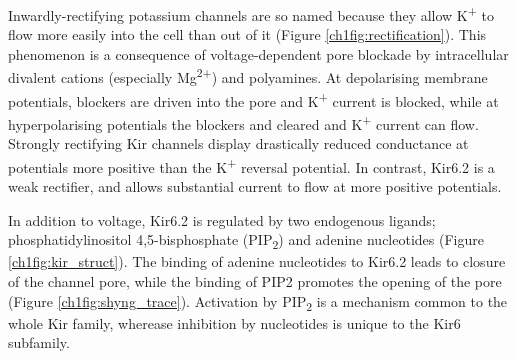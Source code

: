 Inwardly-rectifying potassium channels are so named because they allow K\textsuperscript{+} to flow more easily into the cell than out of it (Figure \ref{ch1fig:rectification}).
This phenomenon is a consequence of voltage-dependent pore blockade by intracellular divalent cations (especially Mg\textsuperscript{2+}) and polyamines.
At depolarising membrane potentials, blockers are driven into the pore and K\textsuperscript{+} current is blocked, while at hyperpolarising potentials the blockers and cleared and K\textsuperscript{+} current can flow.
Strongly rectifying Kir channels display drastically reduced conductance at potentials more positive than the K\textsuperscript{+} reversal potential.
In contrast, Kir6.2 is a weak rectifier, and allows substantial current to flow at more positive potentials.

In addition to voltage, Kir6.2 is regulated by two endogenous ligands; 
phosphatidylinositol 4,5-bisphosphate (PIP\textsubscript{2}) and adenine nucleotides (Figure \ref{ch1fig:kir_struct}).
The binding of adenine nucleotides to Kir6.2 leads to closure of the channel pore, while the binding of PIP2 promotes the opening of the pore (Figure \ref{ch1fig:shyng_trace}).
Activation by PIP\textsubscript{2} is a mechanism common to the whole Kir family, wherease inhibition by nucleotides is unique to the Kir6 subfamily.

